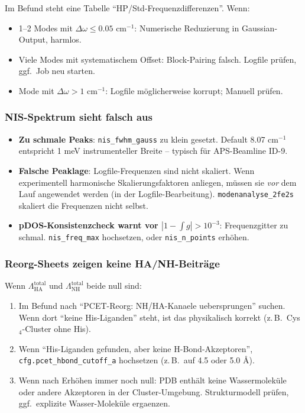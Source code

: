 \documentclass[11pt,a4paper,twoside]{article}
\theoremstyle{remark}
\begin{document}
Im Befund steht eine Tabelle ``HP/Std-Frequenzdifferenzen''. Wenn:

\begin{itemize}
  \item 1--2 Modes mit $\Delta\omega \leq 0.05$ cm$^{-1}$:
        Numerische Reduzierung in Gaussian-Output, harmlos.
  \item Viele Modes mit systematischem Offset:
        Block-Pairing falsch. Logfile pr\"ufen, ggf.\ Job neu starten.
  \item Mode mit $\Delta\omega > 1$ cm$^{-1}$:
        Logfile m\"oglicherweise korrupt; Manuell pr\"ufen.
\end{itemize}

\subsubsection*{NIS-Spektrum sieht falsch aus}

\begin{itemize}
  \item \textbf{Zu schmale Peaks}: \texttt{nis\_fwhm\_gauss} zu klein
        gesetzt. Default 8.07 cm$^{-1}$ entspricht 1 meV instrumenteller
        Breite -- typisch f\"ur APS-Beamline ID-9.
  \item \textbf{Falsche Peaklage}: Logfile-Frequenzen sind nicht
        skaliert. Wenn experimentell harmonische Skalierungsfaktoren
        anliegen, m\"ussen sie \emph{vor} dem Lauf angewendet werden
        (in der Logfile-Bearbeitung). \texttt{modenanalyse\_2fe2s}
        skaliert die Frequenzen nicht selbst.
  \item \textbf{pDOS-Konsistenzcheck warnt vor $|1 - \int g|>10^{-3}$}:
        Frequenzgitter zu schmal. \texttt{nis\_freq\_max} hochsetzen,
        oder \texttt{nis\_n\_points} erh\"ohen.
\end{itemize}

\subsubsection*{Reorg-Sheets zeigen keine HA/NH-Beitr\"age}

Wenn $\Lambda_\text{HA}^\text{total}$ und $\Lambda_\text{NH}^\text{total}$
beide null sind:

\begin{enumerate}
  \item Im Befund nach ``PCET-Reorg: NH/HA-Kanaele uebersprungen''
        suchen. Wenn dort ``keine His-Liganden'' steht, ist das
        physikalisch korrekt (z.\,B.\ Cys$_4$-Cluster ohne His).
  \item Wenn ``His-Liganden gefunden, aber keine H-Bond-Akzeptoren'',
        \texttt{cfg.pcet\_hbond\_cutoff\_a} hochsetzen (z.\,B.\ auf
        4.5 oder 5.0 \AA{}).
  \item Wenn nach Erh\"ohen immer noch null: PDB enth\"alt keine
        Wassermolek\"ule oder andere Akzeptoren in der Cluster-Umgebung.
        Strukturmodell pr\"ufen, ggf.\ explizite Wasser-Molek\"ule
        ergaenzen.
\end{enumerate}
\end{document}
